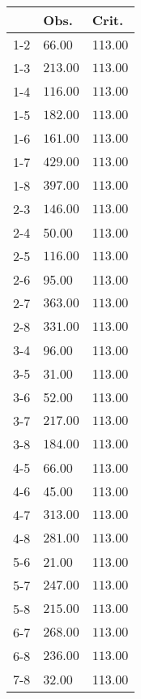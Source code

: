 \begin{table}[ht]
\centering
\begin{tabular}{rll}
  \hline
 & Obs. & Crit. \\ 
  \hline
1-2 & 66.00 & 113.00 \\ 
  1-3 & \(\mathbf{213.00}\) & \(\mathbf{113.00}\) \\ 
  1-4 & \(\mathbf{116.00}\) & \(\mathbf{113.00}\) \\ 
  1-5 & \(\mathbf{182.00}\) & \(\mathbf{113.00}\) \\ 
  1-6 & \(\mathbf{161.00}\) & \(\mathbf{113.00}\) \\ 
  1-7 & \(\mathbf{429.00}\) & \(\mathbf{113.00}\) \\ 
  1-8 & \(\mathbf{397.00}\) & \(\mathbf{113.00}\) \\ 
  2-3 & \(\mathbf{146.00}\) & \(\mathbf{113.00}\) \\ 
  2-4 & 50.00 & 113.00 \\ 
  2-5 & \(\mathbf{116.00}\) & \(\mathbf{113.00}\) \\ 
  2-6 & 95.00 & 113.00 \\ 
  2-7 & \(\mathbf{363.00}\) & \(\mathbf{113.00}\) \\ 
  2-8 & \(\mathbf{331.00}\) & \(\mathbf{113.00}\) \\ 
  3-4 & 96.00 & 113.00 \\ 
  3-5 & 31.00 & 113.00 \\ 
  3-6 & 52.00 & 113.00 \\ 
  3-7 & \(\mathbf{217.00}\) & \(\mathbf{113.00}\) \\ 
  3-8 & \(\mathbf{184.00}\) & \(\mathbf{113.00}\) \\ 
  4-5 & 66.00 & 113.00 \\ 
  4-6 & 45.00 & 113.00 \\ 
  4-7 & \(\mathbf{313.00}\) & \(\mathbf{113.00}\) \\ 
  4-8 & \(\mathbf{281.00}\) & \(\mathbf{113.00}\) \\ 
  5-6 & 21.00 & 113.00 \\ 
  5-7 & \(\mathbf{247.00}\) & \(\mathbf{113.00}\) \\ 
  5-8 & \(\mathbf{215.00}\) & \(\mathbf{113.00}\) \\ 
  6-7 & \(\mathbf{268.00}\) & \(\mathbf{113.00}\) \\ 
  6-8 & \(\mathbf{236.00}\) & \(\mathbf{113.00}\) \\ 
  7-8 & 32.00 & 113.00 \\ 
   \hline
\end{tabular}
\end{table}
